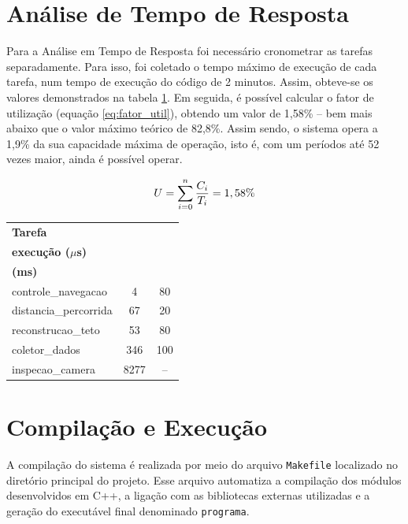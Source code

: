 \documentclass[12pt]{article}
\begin{document}
\section{Análise de Tempo de Resposta}

Para a Análise em Tempo de Resposta foi necessário cronometrar as tarefas separadamente. Para isso, foi coletado o tempo máximo de execução de cada tarefa, num tempo de execução do código de 2 minutos. Assim, obteve-se os valores demonstrados na tabela \ref{tab:tempo_tarefas}. Em seguida, é possível calcular o fator de utilização (equação \ref{eq:fator_util}), obtendo um valor de 1,58\% -- bem mais abaixo que o valor máximo teórico de 82,8\%. Assim sendo, o sistema opera a 1,9\% da sua capacidade máxima de operação, isto é, com um períodos até 52 vezes maior, ainda é possível operar.

\begin{equation}
    \centering
    \label{eq:fator_util}
    U = \sum_{i=0}^{n} \frac{C_i}{T_i} = 1,58\%
\end{equation}

\begin{table}[]
\centering
\label{tab:tempo_tarefas}
\begin{tabular}{l c c} 
\toprule
\textbf{Tarefa} & \makecell{\textbf{Tempo máximo de} \\ \textbf{execução ($\mu$s)}} & \makecell{\textbf{Período} \\ \textbf{(ms)}} \\ 
\midrule
controle\_navegacao    & 4    & 80  \\
distancia\_percorrida  & 67   & 20  \\
reconstrucao\_teto     & 53   & 80  \\
coletor\_dados         & 346  & 100 \\
inspecao\_camera       & 8277 & --  \\
\bottomrule
\end{tabular}
\end{table}

\section{Compilação e Execução}

A compilação do sistema é realizada por meio do arquivo \texttt{Makefile} localizado no diretório principal do projeto. Esse arquivo automatiza a compilação dos módulos desenvolvidos em C++, a ligação com as bibliotecas externas utilizadas e a geração do executável final denominado \texttt{programa}.
\end{document}
